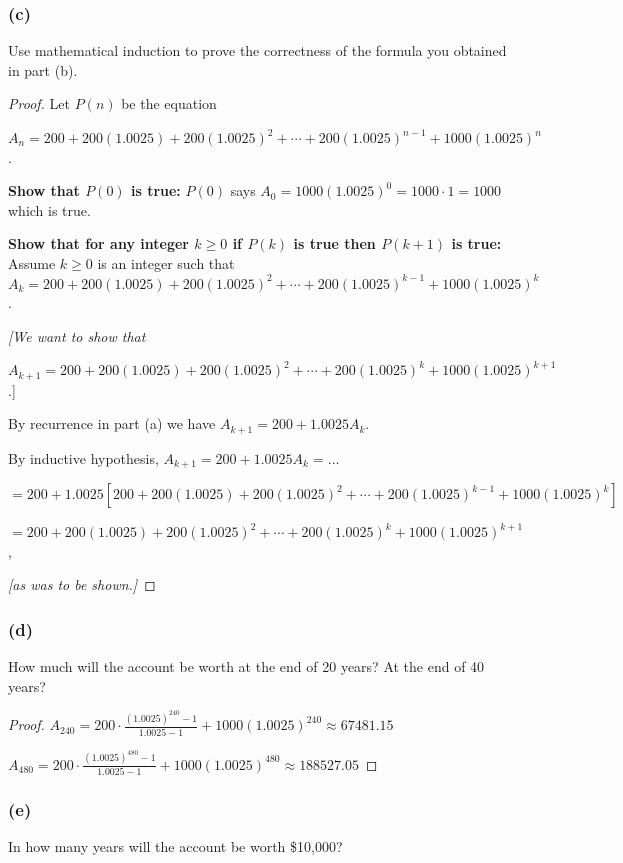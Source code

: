 \documentclass[14pt]{extarticle}
\newcommand{\dps}{\displaystyle}
\begin{document}
\subsubsection{(c)}
Use mathematical induction to prove the correctness of the formula you obtained in part (b).

\begin{proof}
Let $P(n)$ be the equation 

\(A_n = 200 + 200(1.0025) + 200(1.0025)^2 + \cdots + 200(1.0025)^{n-1} + 1000(1.0025)^n\).

{\bf Show that $P(0)$ is true:} $P(0)$ says \(A_0 = 1000(1.0025)^0 = 1000 \cdot 1 = 1000\) which is true.

{\bf Show that for any integer \(k \geq 0\) if $P(k)$ is true then \(P(k+1)\) is true:}
Assume \(k \geq 0\) is an integer such that
\(A_k = 200 + 200(1.0025) + 200(1.0025)^2 + \cdots + 200(1.0025)^{k-1} + 1000(1.0025)^k\). 
{\it [We want to show that 

\(A_{k+1} = 200 + 200(1.0025) + 200(1.0025)^2 + \cdots + 200(1.0025)^k + 1000(1.0025)^{k+1}\).]}

By recurrence in part (a) we have \(A_{k+1} = 200 + 1.0025 A_k.\)

By inductive hypothesis, 
\(A_{k+1} = 200 + 1.0025 A_k = \ldots\)

\(= 200 + 1.0025[200 + 200(1.0025) + 200(1.0025)^2 + \cdots + 200(1.0025)^{k-1} + 1000(1.0025)^k]\)

\(= 200 + 200(1.0025) + 200(1.0025)^2 + \cdots + 200(1.0025)^k + 1000(1.0025)^{k+1}\),

{\it [as was to be shown.]}
\end{proof}

\subsubsection{(d)}
How much will the account be worth at the end of 20 years? At the end of 40 years?

\begin{proof}
\(A_{240} = \dps 200 \cdot \frac{(1.0025)^{240} - 1}{1.0025 - 1} + 1000(1.0025)^{240} \approx 67481.15\)

\(A_{480} = \dps 200 \cdot \frac{(1.0025)^{480} - 1}{1.0025 - 1} + 1000(1.0025)^{480} \approx 188527.05\)
\end{proof}

\subsubsection{(e)}
In how many years will the account be worth \$10,000?
\end{document}
